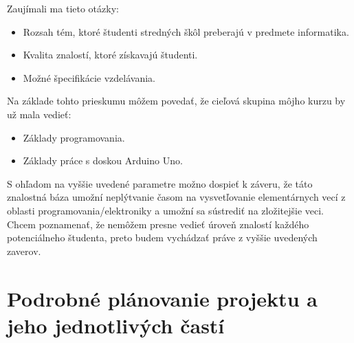 Zaujímali ma tieto otázky:
\begin{itemize}
    \item Rozsah tém, ktoré študenti stredných škôl preberajú v predmete informatika.
    \item Kvalita znalostí, ktoré získavajú študenti.
    \item Možné špecifikácie vzdelávania.
\end{itemize}
Na základe tohto prieskumu môžem povedať, že cieľová skupina môjho kurzu by už mala vedieť:
\begin{itemize}
    \item Základy programovania.
    \item Základy práce s doskou Arduino Uno.
\end{itemize}
S ohľadom na vyššie uvedené parametre možno dospieť k záveru, že táto znalostná báza umožní neplýtvanie časom na vysvetľovanie elementárnych vecí z oblasti programovania/elektroniky a umožní sa sústrediť na zložitejšie veci. Chcem poznamenať, že nemôžem presne vedieť úroveň znalostí každého potenciálneho študenta, preto budem vychádzať práve z vyššie uvedených zaverov.

\section{Podrobné plánovanie projektu a jeho jednotlivých častí}
